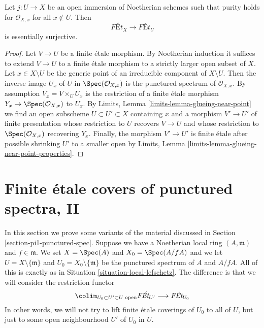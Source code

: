 \begin{lemma}
\label{lemma-extend-pure}
Let $j : U \to X$ be an open immersion of Noetherian schemes
such that purity holds for $\mathcal{O}_{X, x}$ for all $x \not \in U$.
Then
$$
\textit{F\'Et}_X \longrightarrow \textit{F\'Et}_U
$$
is essentially surjective.
\end{lemma}

\begin{proof}
Let $V \to U$ be a finite \'etale morphism. By Noetherian
induction it suffices to extend $V \to U$ to a finite \'etale
morphism to a strictly larger open subset of $X$.
Let $x \in X \setminus U$ be the generic point of
an irreducible component of $X \setminus U$.
Then the inverse image $U_x$ of $U$ in $\Spec(\mathcal{O}_{X, x})$
is the punctured spectrum of $\mathcal{O}_{X, x}$.
By assumption $V_x = V \times_U U_x$ is the restriction
of a finite \'etale morphism $Y_x \to \Spec(\mathcal{O}_{X, x})$
to $U_x$.
By Limits, Lemma \ref{limits-lemma-glueing-near-point}
we find an open subscheme $U \subset U' \subset X$
containing $x$ and a morphism $V' \to U'$ of finite presentation
whose restriction to $U$ recovers $V \to U$ and
whose restriction to $\Spec(\mathcal{O}_{X, x})$ recovering $Y_x$.
Finally, the morphism $V' \to U'$ is finite \'etale
after possible shrinking $U'$ to a smaller open by
Limits, Lemma \ref{limits-lemma-glueing-near-point-properties}.
\end{proof}
















\section{Finite \'etale covers of punctured spectra, II}
\label{section-pi1-punctured-spec-II}

\noindent
In this section we prove some variants of the material discussed
in Section \ref{section-pi1-punctured-spec}. Suppose
we have a Noetherian local ring $(A, \mathfrak m)$ and $f \in \mathfrak m$.
We set $X = \Spec(A)$ and $X_0 = \Spec(A/fA)$ and we
let $U = X \setminus \{\mathfrak m\}$ and
$U_0 = X_0 \setminus \{\mathfrak m\}$ be the punctured spectrum of
$A$ and $A/fA$. All of this is exactly as in
Situation \ref{situation-local-lefschetz}.
The difference is that we will consider the restriction functor
$$
\colim_{U_0 \subset U' \subset U\text{ open}} \textit{F\'Et}_{U'}
\longrightarrow
\textit{F\'Et}_{U_0}
$$
In other words, we will not try to lift finite \'etale coverings
of $U_0$ to all of $U$, but just to some open neighbourhood
$U'$ of $U_0$ in $U$.

